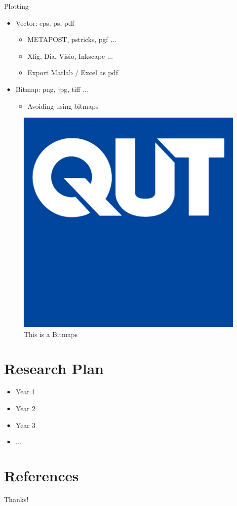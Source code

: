 \documentclass{beamer}
\begin{document}
\begin{frame}{Plotting}
    \begin{itemize}
        \item Vector: eps, ps, pdf
        \begin{itemize}
            \item METAPOST, pstricks, pgf $\ldots$
            \item Xfig, Dia, Visio, Inkscape $\ldots$
            \item Export Matlab / Excel as pdf
        \end{itemize}
        \item Bitmap: png, jpg, tiff $\ldots$
        \begin{itemize}
            \item Avoiding using bitmaps 
        \end{itemize}
    \end{itemize}
    \begin{figure}[htpb]
        \centering
        \includegraphics[width=0.2\linewidth]{pic/QUT_Logo_CMYK.jpg}
        \caption{This is a Bitmaps}
    \end{figure}
\end{frame}

\section{Research Plan}
\begin{frame}
    \begin{itemize}
        \item Year 1
        \item Year 2
        \item Year 3
        \item ...
    \end{itemize}
\end{frame}

\section{References}

\begin{frame}[allowframebreaks]
    
    
\end{frame}

\begin{frame}
    \begin{center}
        {\Huge\calligra Thanks!}
    \end{center}
\end{frame}
\end{document}
